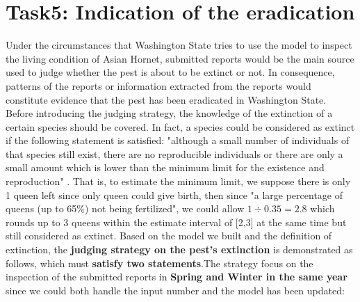 \documentclass{mcmthesis}
\begin{document}
\section{Task5: Indication of the eradication}
	\quad Under the circumstances that Washington State tries to use the model to inspect the living condition of Asian Hornet, submitted reports would be the main source used to judge whether the pest is about to be extinct or not. In consequence, patterns of the reports or information extracted from the reports would constitute evidence that the pest has been eradicated in Washington State. Before introducing the judging strategy, the knowledge of the extinction of a certain species should be covered. In fact, a species could be considered as extinct if the following statement is satisfied: "although a small number of individuals of that species still exist, there are no reproducible individuals or there are only a small amount which is lower than the minimum limit for the existence and reproduction" \cite{functional_extinction}. That is, to estimate the minimum limit, we suppose there is only 1 queen left since only queen could give birth, then since "a large percentage of queens (up to 65\%) not being fertilized", we could allow $1 \div 0.35 = 2.8$ which rounds up to 3 queens within the estimate interval of [2,3] at the same time but still considered as extinct. Based on the model we built and the definition of extinction, the \textbf{judging strategy on the pest's extinction} is demonstrated as follows, which must \textbf{satisfy two statements}.The strategy focus on the inspection of the submitted reports in \textbf{Spring and Winter in the same year} since we could both handle the input number and the model has been updated:\\
\end{document}
